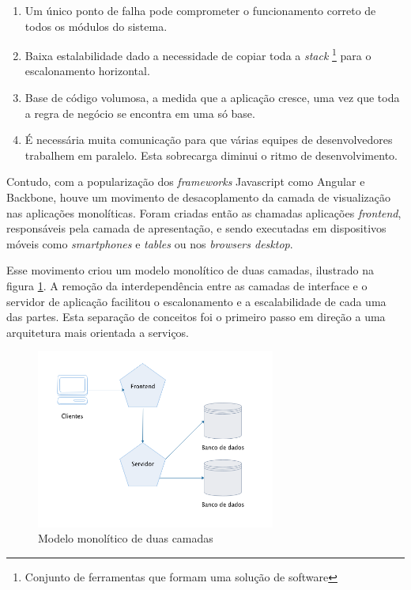 \begin{enumerate}[label=\alph*)]
    \item Um único ponto de falha pode comprometer o funcionamento correto de todos os módulos do sistema.
    \item Baixa estalabilidade dado a necessidade de copiar toda a \textit{stack} \footnote{Conjunto de ferramentas que formam uma solução de software} para o escalonamento horizontal.
    \item Base de código volumosa, a medida que a aplicação cresce, uma vez que toda a regra de negócio se encontra em uma só base.
    \item É necessária muita comunicação para que várias equipes de desenvolvedores trabalhem em paralelo. Esta sobrecarga diminui o ritmo de desenvolvimento.
\end{enumerate}

Contudo, com a popularização dos \textit{frameworks} Javascript como Angular e Backbone, houve um movimento de desacoplamento da camada de visualização nas aplicações monolíticas. Foram criadas então as chamadas aplicações \textit{frontend}, responsáveis pela camada de apresentação, e sendo executadas em dispositivos móveis como \textit{smartphones} e \textit{tables} ou nos \textit{browsers desktop}. 

Esse movimento criou um modelo monolítico de duas camadas, ilustrado na figura \ref{fig:two-tier-monolithic}. A remoção da interdependência entre as camadas de interface e o servidor de aplicação facilitou o escalonamento e a escalabilidade de cada uma das partes. Esta separação de conceitos foi o primeiro passo em direção a uma arquitetura mais orientada a serviços.

\begin{figure}[htbp]
    \centering
    \includegraphics[width=0.7\textwidth]{figuras/monolithic-2-tier.png}
    \caption{Modelo monolítico de duas camadas}
    \label{fig:two-tier-monolithic}
\end{figure}

